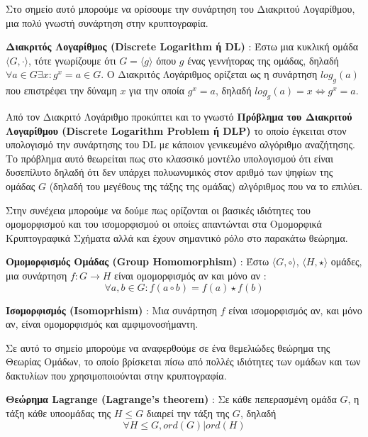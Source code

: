 Στο σημείο αυτό μπορούμε να ορίσουμε την συνάρτηση του Διακριτού Λογαρίθμου, μια πολύ γνωστή συνάρτηση στην κρυπτογραφία.

\begin{definition}
\textbf{Διακριτός Λογαρίθμος (Discrete Logarithm ή DL)} : Έστω μια κυκλική ομάδα $\langle G, \cdot \rangle$, τότε γνωρίζουμε ότι $G = \langle g \rangle$ όπου $g$ ένας γεννήτορας της ομάδας, δηλαδή  $\forall a \in G  \exists x : g^x=a \in G$. Ο Διακριτός Λογάριθμος ορίζεται ως η συνάρτηση $log_g(a)$ που επιστρέφει την δύναμη $x$ για την οποία $g^x=a$, δηλαδή $log_g(a)=x \Leftrightarrow g^x=a$.
\end{definition}

Από τον Διακριτό Λογάριθμο προκύπτει και το γνωστό \textbf{Πρόβλημα του Διακριτού Λογαρίθμου (Discrete Logarithm Problem ή DLP)} το οποίο έγκειται στον υπολογισμό την συνάρτησης του DL με κάποιον γενικευμένο αλγόριθμο αναζήτησης. Το πρόβλημα αυτό θεωρείται πως στο κλασσικό μοντέλο υπολογισμού ότι είναι δυσεπίλυτο δηλαδή ότι δεν υπάρχει πολυωνυμικός στον αριθμό των ψηφίων της ομάδας $G$ (δηλαδή του μεγέθους της τάξης της ομάδας) αλγόριθμος που να το επιλύει.

Στην συνέχεια μπορούμε να δούμε πως ορίζονται οι βασικές ιδιότητες του ομομορφισμού και του ισομορφισμού οι οποίες απαντώνται στα Ομομορφικά Κρυπτογραφικά Σχήματα αλλά και έχουν σημαντικό ρόλο στο παρακάτω θεώρημα.

\begin{definition}
\textbf{Ομομορφισμός Ομάδας (Group Homomorphism)} : Έστω $\langle G, \circ \rangle$, $\langle H, \star \rangle$ ομάδες, μια συνάρτηση $f : G \rightarrow H$ είναι ομομορφισμός αν και μόνο αν :
$$
\forall a, b \in G : f(a \circ b) = f(a) \star f(b)
$$
\end{definition}

\begin{definition}
\textbf{Ισομορφισμός (Isomoprhism)} : Μια συνάρτηση $f$ είναι ισομορφισμός αν, και μόνο αν, είναι ομομορφισμός και αμφιμονοσήμαντη.
\end{definition}

Σε αυτό το σημείο μπορούμε να αναφερθούμε σε ένα θεμελιώδες θεώρημα της Θεωρίας Ομάδων, το οποίο βρίσκεται πίσω από πολλές ιδιότητες των ομάδων και των δακτυλίων που χρησιμοποιούνται στην κρυπτογραφία.

\begin{theorem}
\textbf{Θεώρημα Lagrange (Lagrange's theorem)} :  Σε κάθε πεπερασμένη ομάδα $G$, η τάξη κάθε υποομάδας της $Η \leq G$ διαιρεί την τάξη της $G$, δηλαδή 
$$
\forall H \leq G, ord(G)|ord(H)
$$
\end{theorem}

